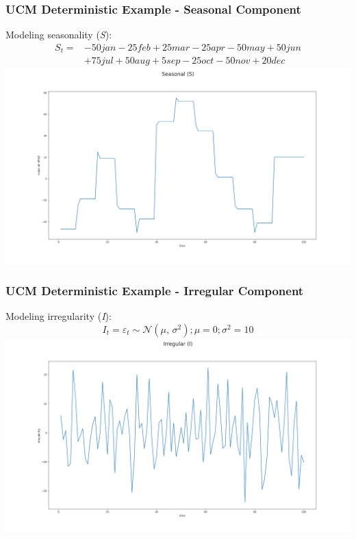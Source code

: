 \documentclass{beamer}
\begin{document}
\begin{frame}[t]\frametitle{UCM Deterministic Example - Seasonal Component}
Modeling seasonality (\textit{S}): \\
\begin{align*}
S_{t} = &-50jan-25feb+25mar-25apr-50may+50jun \\
&+75jul+50aug+5sep-25oct-50nov+20dec
\end{align*}
\includegraphics[width=\textwidth, height=0.6\textheight]{ucm_deterministic_seasonal}
\end{frame}

\begin{frame}[t]\frametitle{UCM Deterministic Example - Irregular Component}
Modeling irregularity (\textit{I}): \\
\[I_{t} = \varepsilon_{t} \sim \mathcal{N}(\mu,\,\sigma^{2});  \mu = 0; \sigma^{2} = 10 \]
\includegraphics[width=\textwidth, height=0.7\textheight]{ucm_deterministic_irregular}
\end{frame}
\end{document}

